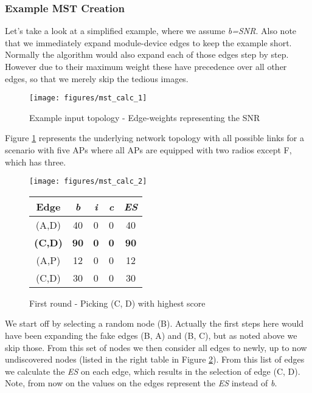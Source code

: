       \subsubsection{Example MST Creation}
	Let's take a look at a simplified example, where we assume \textit{b=SNR}.
	Also note that we immediately expand module-device edges to keep the example short.
	Normally the algorithm would also expand each of those edges step by step.
	However due to their maximum weight these have precedence over all other edges, so that we merely skip the tedious images.
	\begin{figure}[h!]
	  \centering
	  \begin{minipage}{0.5\textwidth}
	    \texttt{[image: figures/mst\_calc\_1]}
	  \end{minipage}
	  \caption{Example input topology - Edge-weights representing the \ac{SNR}}
	  \label{fig:mst_calc_initial}
	\end{figure}
	
	Figure \ref{fig:mst_calc_initial} represents the underlying network topology with all possible links for a scenario with five APs where all APs are equipped with two
	radios except F, which has three.
	
	\begin{figure}[h!]
	  \centering
	  \begin{minipage}{7.4cm}
	    \texttt{[image: figures/mst\_calc\_2]}
	  \end{minipage}
	  \begin{minipage}{4cm}
	    \begin{tabular}{c||c|c|c||c}
	      Edge & \textit{b} & \textit{i} & \textit{c} & \textit{ES}\\ \hline\hline
	      (A,D) & 40 & 0 & 0 & 40 \\ \hline
	      \textbf{(C,D)} & \textbf{90} & \textbf{0} & \textbf{0} & \textbf{90} \\ \hline
	      (A,P) & 12 & 0 & 0 & 12 \\ \hline
	      (C,D) & 30 & 0 & 0 & 30 \\ \hline
	    \end{tabular}
	  \end{minipage}
	  \caption{First round - Picking (C, D) with highest score}
	  \label{fig:mst_calc_2}
	\end{figure}
	
\newpage
	
	We start off by selecting a random node (B).
	Actually the first steps here would have been expanding the fake edges (B, A) and (B, C), but as noted above we skip those.
	From this set of nodes we then consider all edges to newly, up to now undiscovered nodes (listed in the right table in Figure \ref{fig:mst_calc_2}).
	From this list of edges we calculate the \textit{ES} on each edge, which results in the selection of edge (C, D). 
	Note, from now on the values on the edges represent the \textit{ES} instead of \textit{b}.
	

